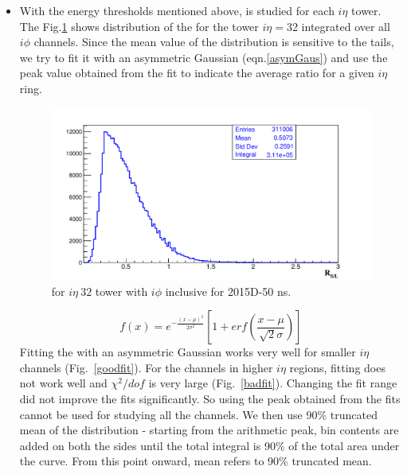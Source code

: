 \begin{itemize}
\item With the energy thresholds mentioned above, \ratiosl is studied 
for each $i\eta$ tower. The Fig.\ref{1DRatio} shows distribution of
the \ratiosl for the tower $i\eta=$32 integrated over all $i \phi$ 
channels. Since the mean value of the distribution is sensitive to 
the tails, we try to fit it with an asymmetric Gaussian 
 (eqn.\ref{asymGaus}) and use the peak value obtained from the fit
to indicate the average ratio for a given $i\eta$ ring.

\begin{figure}[h!]
\centering
\includegraphics[width=0.7\linewidth]{../Figures/Chap2/ImageFiles_HF/Ratio/Ratioieta32254833El40.pdf}
\caption{\ratiosl for $i \eta\ 32$ tower with $i \phi$ inclusive for 2015D-50 ns.}
\label{1DRatio}
\end{figure}
\begin{equation}
f(x)=e^{-\frac{(x-\mu)^2}{2\sigma^2}}\left[ 1+erf\left( \frac{x-\mu}{\sqrt{2}\sigma}\right) \right] 
\label{asymGaus} 
\end{equation}
Fitting the \ratiosl with an asymmetric Gaussian works very well for 
smaller $i\eta$ channels (Fig.~\ref{goodfit}). For the channels in
higher $i\eta$ regions, fitting does not work well and $\chi^2/dof$ is 
very large (Fig.~\ref{badfit}). Changing the fit range did not improve the fits significantly. So using the peak obtained from the 
fits cannot be used for studying all the channels. We then use 90\% 
truncated mean of the distribution - starting from the arithmetic peak,
bin contents are added on both the sides until the total integral is
90\% of the total area under the curve. From this point onward, mean 
refers to 90\% truncated mean. 


\end{itemize}
